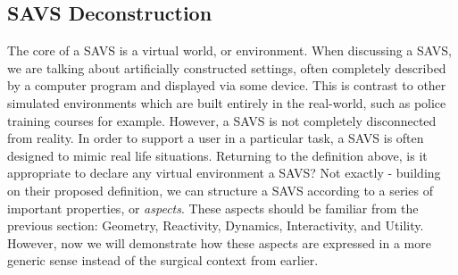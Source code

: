 \subsection{SAVS Deconstruction}

The core of a SAVS is a virtual world, or environment. When discussing
a SAVS, we are talking about artificially constructed settings, often
completely described by a computer program and displayed via some
device. This is contrast to other simulated environments which are
built entirely in the real-world, such as police training courses for
example. However, a SAVS is not completely disconnected from
reality. In order to support a user in a particular task, a SAVS is
often designed to mimic real life situations. Returning to the
definition above, is it appropriate to declare any virtual environment
a SAVS? Not exactly - building on their proposed definition, we can
structure a SAVS according to a series of important properties, or
\textit{aspects}. These aspects should be familiar from the previous
section: Geometry, Reactivity, Dynamics, Interactivity, and
Utility. However, now we will demonstrate how these aspects are
expressed in a more generic sense instead of the surgical context from
earlier.

